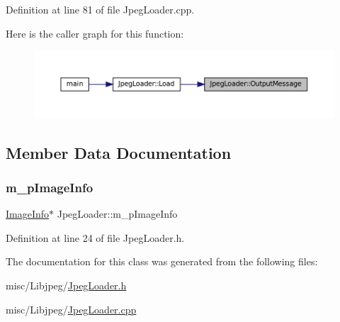 Definition at line 81 of file Jpeg\+Loader.\+cpp.

Here is the caller graph for this function\+:
\nopagebreak
\begin{figure}[H]
\begin{center}
\leavevmode
\includegraphics[width=350pt]{classJpegLoader_ae23a077fd30b90b04edeb13f89b36a3e_icgraph}
\end{center}
\end{figure}


\subsection{Member Data Documentation}
\mbox{\label{classJpegLoader_ac5483c3fe2fb14ec56fb2bdda4ba1b50}} 
\subsubsection{\texorpdfstring{m\_pImageInfo}{m\_pImageInfo}}
{\footnotesize\ttfamily \mbox{\hyperlink{structJpegLoader_1_1ImageInfo}{Image\+Info}}$\ast$ Jpeg\+Loader\+::m\+\_\+p\+Image\+Info\hspace{0.3cm}{\ttfamily [private]}}



Definition at line 24 of file Jpeg\+Loader.\+h.



The documentation for this class was generated from the following files\+:\begin{DoxyCompactItemize}
\item 
misc/\+Libjpeg/\mbox{\hyperlink{JpegLoader_8h}{Jpeg\+Loader.\+h}}\item 
misc/\+Libjpeg/\mbox{\hyperlink{JpegLoader_8cpp}{Jpeg\+Loader.\+cpp}}\end{DoxyCompactItemize}
